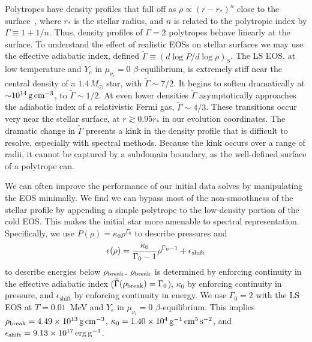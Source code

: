 Polytropes have density profiles that
fall off as $\rho \propto (r-r_{*})^n$ close to the surface~\citep{gund2009-star_surface_sound_waves},
where $r_{*}$ is the stellar radius, and
$n$ is related to the polytropic index by $\Gamma \equiv 1+1/n$.
Thus, density profiles of $\Gamma=2$ polytropes behave linearly at the surface.
To understand the effect of realistic EOSs on stellar surfaces
we may use the effective adiabatic index, defined
$\tilde{\Gamma} \equiv (d\log P/d\log \rho)_S$.
The LS EOS, at low temperature and $Y_e$ in $\mu_{\nu_i}=0$ $\beta$-equilibrium,
is extremely stiff near the central density of a $1.4\,M_{\odot}$ star, with
$\tilde{\Gamma} \sim 7/2$.
It begins to soften dramatically at $\mathord{\sim}10^{14}\,\text{g}\,\text{cm}^{-3}$,
to $\tilde{\Gamma} \sim 1/2$.
At even lower densities $\tilde{\Gamma}$
asymptotically approaches the adiabatic index of a relativistic
Fermi gas, $\tilde{\Gamma} \sim 4/3$.
These transitions occur very near the stellar surface,
at $r \gtrsim 0.95 r_{*}$ in our evolution coordinates.
The dramatic change in $\tilde{\Gamma}$ presents a kink in the density profile
that is difficult to resolve, especially with spectral methods.
Because the kink occurs over a range of radii,
it cannot be captured by a subdomain boundary,
as the well-defined surface of a polytrope can.

We can often improve the performance of our initial data solves
by manipulating the EOS minimally.
We find we can bypass most of the non-smoothness of the stellar profile
by appending a simple polytrope to the low-density portion of the cold EOS.
This makes the initial star more amenable to spectral representation.
Specifically, we use $P(\rho)=\kappa_0 \rho^{\Gamma_0}$
to describe pressures and
\begin{equation}
\epsilon(\rho) = \frac{\kappa_0}{\Gamma_0-1} \rho^{\Gamma_0-1} + \epsilon_{\rm shift} \nonumber
\end{equation}
to describe energies below $\rho_{\rm break}$.
$\rho_{\rm break}$ is determined by enforcing continuity in the effective
adiabatic index ($\tilde{\Gamma}(\rho_{\rm break})=\Gamma_0$),
$\kappa_0$ by enforcing continuity in pressure,
and $\epsilon_{\text{shift}}$ by enforcing continuity in energy.
We use $\Gamma_0=2$ with the LS EOS at $T=0.01$~MeV and $Y_e$ in
$\mu_{\nu_i}=0$ $\beta$-equilibrium.
This implies $\rho_{\rm break} = 4.49 \times 10^{13}\,\rm g\, cm^{-3}$,
$\kappa_0 = 1.40 \times 10^{4}\,\rm g^{-1}\,cm^{5}\,s^{-2}$,
and $\epsilon_{\rm shift} = 9.13 \times 10^{17}\,\rm erg\, g^{-1}$.

